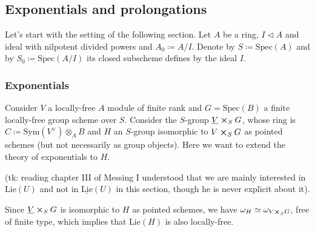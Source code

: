 \documentclass[../Main]{subfiles}
\begin{document}
\subsection{Exponentials and prolongations}
Let's start with the setting of the following section.
Let $A$ be a ring, $I \triangleleft A$ and ideal with nilpotent
divided powers and $A_0 \coloneqq A/I$.
Denote by $S \coloneqq \mathrm{Spec}(A)$
and by $S_0 \coloneqq \mathrm{Spec}(A/I)$ its closed
subscheme defines by the ideal $I$.



\subsubsection{Exponentials}
Consider $V$ a locally-free $A$ module of finite rank
and $G = \mathrm{Spec}(B)$ a finite locally-free 
group scheme over $S$.
Consider the $S$-group $\underline{V} \cross_{ S } G$, whose ring is
$C \coloneqq \mathrm{Sym}(V^\vee) \otimes_A B$ and $H$ an $S$-group isomorphic
to $V \cross_{ S } G$ as pointed schemes (but not necessarily
as group objects).
Here we want to extend the theory of exponentials to $H$.


\begin{rem}[]
	(tk: reading chapter III of Messing I understood that we
	are mainly interested in $\mathrm{Lie}(U)$ and not in
	$\underline{\mathrm{Lie}}(U)$ in this section,
	though he is never explicit about it).
\end{rem}


\begin{rem}[]
	Since $\underline{V} \cross_{ S } G$ is isomorphic to $H$ as pointed
	schemes, we have $\omega_H \simeq \omega_{V \cross_S G}$, free of finite type,
	which implies that $\mathrm{Lie}(H)$ is also locally-free.
\end{rem}
\end{document}

